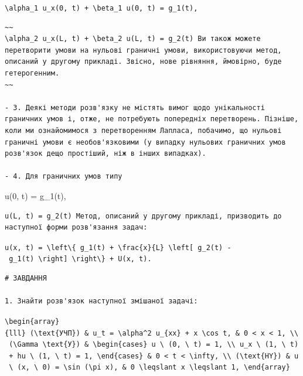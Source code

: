 \documentclass[
  ukrainian,
]{article}
\begin{document}
\texttt{\textbackslash{}alpha\_1\ u\_x(0,\ t)\ +\ \textbackslash{}beta\_1\ u(0,\ t)\ =\ g\_1(t),}

\begin{verbatim}
~~
\alpha_2 u_x(L, t) + \beta_2 u(L, t) = g_2(t) Ви також можете перетворити умови на нульові граничні умови, використовуючи метод, описаний у другому прикладі. Звісно, нове рівняння, ймовірно, буде гетерогенним.
~~

- 3. Деякі методи розв'язку не містять вимог щодо унікальності граничних умов і, отже, не потребують попередніх перетворень. Пізніше, коли ми ознайомимося з перетворенням Лапласа, побачимо, що нульові граничні умови є необов'язковими (у випадку нульових граничних умов розв'язок дещо простіший, ніж в інших випадках).

- 4. Для граничних умов типу
\end{verbatim}

u(0, t) = g\_1(t),

\begin{verbatim}
u(L, t) = g_2(t) Метод, описаний у другому прикладі, призводить до наступної форми розв'язання задач:
\end{verbatim}

\texttt{u(x,\ t)\ =\ \textbackslash{}left\textbackslash{}\{\ g\_1(t)\ +\ \textbackslash{}frac\{x\}\{L\}\ \textbackslash{}left{[}\ g\_2(t)\ -\ g\_1(t)\ \textbackslash{}right{]}\ \textbackslash{}right\textbackslash{}\}\ +\ U(x,\ t).}

\begin{verbatim}
# ЗАВДАННЯ

1. Знайти розв'язок наступної змішаної задачі:
\end{verbatim}

\texttt{\textbackslash{}begin\{array\}\{lll\}\ (\textbackslash{}text\{УЧП\})\ \&\ u\_t\ =\ \textbackslash{}alpha\^{}2\ u\_\{xx\}\ +\ x\ \textbackslash{}cos\ t,\ \&\ 0\ \textless{}\ x\ \textless{}\ 1,\ \textbackslash{}\textbackslash{}\ (\textbackslash{}Gamma\ \textbackslash{}text\{У\})\ \&\ \textbackslash{}begin\{cases\}\ u\ \textbackslash{}\ (0,\ \textbackslash{}\ t)\ =\ 1,\ \textbackslash{}\textbackslash{}\ u\_x\ \textbackslash{}\ (1,\ \textbackslash{}\ t)\ +\ hu\ \textbackslash{}\ (1,\ \textbackslash{}\ t)\ =\ 1,\ \textbackslash{}end\{cases\}\ \&\ 0\ \textless{}\ t\ \textless{}\ \textbackslash{}infty,\ \textbackslash{}\textbackslash{}\ (\textbackslash{}text\{HY\})\ \&\ u\ \textbackslash{}\ (x,\ \textbackslash{}\ 0)\ =\ \textbackslash{}sin\ (\textbackslash{}pi\ x),\ \&\ 0\ \textbackslash{}leqslant\ x\ \textbackslash{}leqslant\ 1,\ \textbackslash{}end\{array\}}
\end{document}
